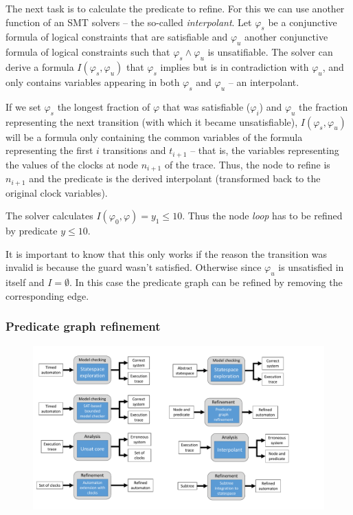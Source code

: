 The next task is to calculate the predicate to refine. For this we can use another function of an SMT solvers -- the so-called \emph{interpolant}.
Let $\varphi_s$ be a conjunctive formula of logical constraints that are satisfiable and $\varphi_u$ another conjunctive formula of logical constraints such that  $\varphi_s \wedge \varphi_u$ is unsatifiable. The solver can derive a formula $I(\varphi_s, \varphi_u)$ that $\varphi_s$ implies but is in contradiction with $\varphi_u$, and only contains variables appearing in both $\varphi_s$  and $\varphi_u$ -- an interpolant.

If we set $\varphi_s$ the longest fraction of $\varphi$ that was satisfiable ($\varphi_i$) and $\varphi_u$ the fraction representing the next transition (with which it became unsatisfiable), $I(\varphi_s, \varphi_u)$ will be a formula only containing the common variables of the formula representing the first $i$ transitions and $t_{i+1}$ -- that is, the variables representing the values of the clocks at node $n_{i+1}$ of the trace. Thus, the node to refine is $n_{i+1}$ and the predicate is the derived interpolant (transformed back to the original clock variables).

\begin{runningExample}
	The solver calculates $I(\varphi_0,\varphi)= y_1 \leq 10$. Thus the node \emph{loop} has to be refined by predicate $y \leq 10$.
\end{runningExample}

It is important to know that this only works if the reason the transition was invalid is because the guard wasn't satisfied. Otherwise since $\varphi_u$ is unsatisfied in itself and $I= \emptyset$. In this case the predicate graph can be refined by removing the corresponding edge.

\subsubsection{Predicate graph refinement}

\begin{figure}[h]
	\centering
	\includegraphics[width=.7\textwidth]{include/figures/pred_modules_ref}
\end{figure}

